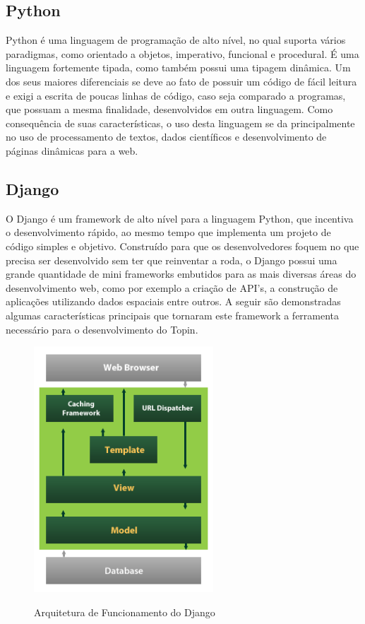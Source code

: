 {{{{{{{\subsection{Python}

Python é uma linguagem de programação de alto nível, no qual suporta vários paradigmas, como orientado a objetos, imperativo, funcional e procedural. É uma linguagem fortemente tipada, como também possui uma tipagem dinâmica. Um dos seus maiores diferenciais se deve ao fato de possuir um código de fácil leitura e exigi a escrita de poucas linhas de código, caso seja comparado a programas, que possuam a mesma finalidade, desenvolvidos em outra linguagem. Como consequência de suas características, o uso desta linguagem se da principalmente no uso de processamento de textos, dados científicos e desenvolvimento de páginas dinâmicas para a web.

\subsection{Django}

O Django é um framework de alto nível para a linguagem Python, que incentiva o desenvolvimento rápido, ao mesmo tempo que implementa um projeto de código simples e objetivo. Construído para que os desenvolvedores foquem no que precisa ser desenvolvido sem ter que reinventar a roda, o Django possui uma grande quantidade de mini frameworks embutidos para as mais diversas áreas do desenvolvimento web, como por exemplo a criação de API's, a construção de aplicações utilizando dados espaciais entre outros. A seguir são demonstradas algumas características principais que tornaram este framework a ferramenta necessário para o desenvolvimento do Topin.

\begin{figure}[H]
\caption{Arquitetura de Funcionamento do Django}
\centering
\includegraphics[width=0.6\textwidth]{imagens/django.png}
\label{fig:django}
\end{figure}

}}}}}}}
